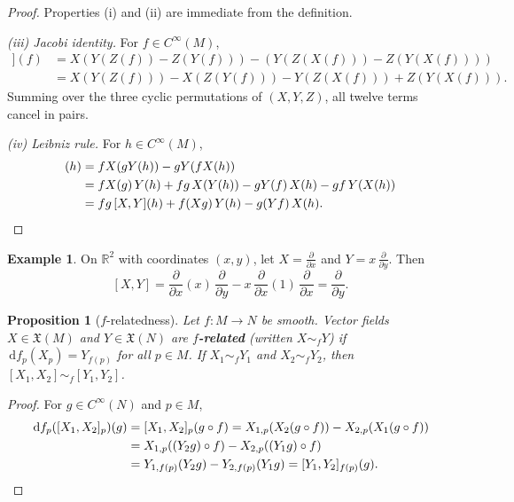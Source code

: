 \documentclass[12pt,a4paper,openany]{book}
\newtheorem{proposition}[theorem]{Proposition}
\theoremstyle{definition}
\newtheorem{example}[theorem]{Example}
\theoremstyle{remark}
\newcommand{\R}{\mathbb{R}}
\newcommand{\dd}{\,\mathrm{d}}
\begin{document}
\begin{proof}
Properties (i) and (ii) are immediate from the definition.

\emph{(iii) Jacobi identity.}  For $f \in C^\infty(M)$,
\begin{align*}
  [X,[Y,Z]](f)
  &= X(Y(Z(f)) - Z(Y(f))) - (Y(Z(X(f))) - Z(Y(X(f)))) \\
  &= X(Y(Z(f))) - X(Z(Y(f))) - Y(Z(X(f))) + Z(Y(X(f))).
\end{align*}
Summing over the three cyclic permutations of $(X, Y, Z)$, all twelve
terms cancel in pairs.

\emph{(iv) Leibniz rule.}  For $h \in C^\infty(M)$,
\begin{align*}
  [fX, gY](h)
  &= fX(gY(h)) - gY(fX(h)) \\
  &= fX(g)\, Y(h) + fg\, X(Y(h)) - gY(f)\, X(h) - gf\, Y(X(h)) \\
  &= fg\,[X,Y](h) + f(Xg)\, Y(h) - g(Yf)\, X(h).
  \qedhere
\end{align*}
\end{proof}

\begin{example}\label{ex:lie-bracket-R2}
On $\R^2$ with coordinates $(x, y)$, let $X = \frac{\partial}{\partial x}$
and $Y = x\,\frac{\partial}{\partial y}$.  Then
\[
  [X, Y] = \frac{\partial}{\partial x}\!\left(x\right)\,
  \frac{\partial}{\partial y}
  - x\, \frac{\partial}{\partial x}\!\left(1\right)\,
  \frac{\partial}{\partial x}
  = \frac{\partial}{\partial y}.
\]
\end{example}

\begin{proposition}[$f$-relatedness]\label{prop:f-related}%
Let $f \colon M \to N$ be smooth.  Vector fields $X \in \mathfrak{X}(M)$
and $Y \in \mathfrak{X}(N)$ are \textbf{$f$-related}
(written $X \sim_f Y$) if $\dd f_p(X_p) = Y_{f(p)}$ for all $p \in M$.
If $X_1 \sim_f Y_1$ and $X_2 \sim_f Y_2$, then
$[X_1, X_2] \sim_f [Y_1, Y_2]$.
\end{proposition}

\begin{proof}
For $g \in C^\infty(N)$ and $p \in M$,
\begin{align*}
  \dd f_p([X_1, X_2]_p)(g)
  &= [X_1, X_2]_p(g \circ f)
  = X_{1,p}(X_2(g \circ f)) - X_{2,p}(X_1(g \circ f)) \\
  &= X_{1,p}((Y_2 g) \circ f) - X_{2,p}((Y_1 g) \circ f) \\
  &= Y_{1,f(p)}(Y_2 g) - Y_{2,f(p)}(Y_1 g)
  = [Y_1, Y_2]_{f(p)}(g).
  \qedhere
\end{align*}
\end{proof}
\end{document}
